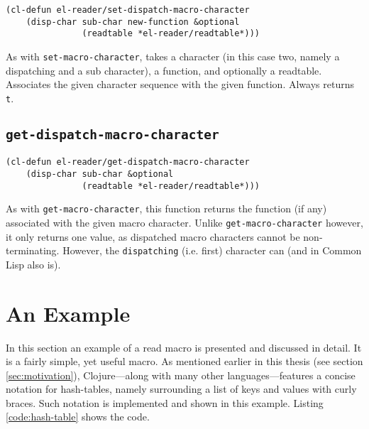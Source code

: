 \documentclass[a4paper,10pt,twoside]{report}
\newcommand{\cl}{Common Lisp}
\newcommand{\sym}[1]{\texttt{#1}}
\newcommand{\fun}[1]{\texttt{#1}}
\newcommand{\tee}{\sym{t}}
\begin{document}
\begin{lstlisting}[style=lispinline]
(cl-defun el-reader/set-dispatch-macro-character
    (disp-char sub-char new-function &optional
               (readtable *el-reader/readtable*)))
\end{lstlisting}

As with \fun{set-macro-character}, takes a character (in this case two, namely a
dispatching and a sub character), a function, and optionally a readtable.
Associates the given character sequence with the given function.  Always returns
\tee{}.

\subsection{\fun{get-dispatch-macro-character}}
\label{subsec:get-dispatch-macro-character}

\begin{lstlisting}[style=lispinline]
(cl-defun el-reader/get-dispatch-macro-character
    (disp-char sub-char &optional
               (readtable *el-reader/readtable*)))
\end{lstlisting}

As with \fun{get-macro-character}, this function returns the function (if any)
associated with the given macro character.  Unlike \fun{get-macro-character}
however, it only returns one value, as dispatched macro characters cannot be
non-terminating.  However, the \texttt{dispatching} (i.e. first) character can
(and in \cl{} also is).

\section{An Example}
\label{sec:example}

In this section an example of a read macro is presented and discussed in detail.
It is a fairly simple, yet useful macro.  As mentioned earlier in this thesis
(see section \ref{sec:motivation}), Clojure---along with many other
languages---features a concise notation for hash-tables, namely surrounding a
list of keys and values with curly braces.  Such notation is implemented and
shown in this example.  Listing \ref{code:hash-table} shows the code.
\end{document}
